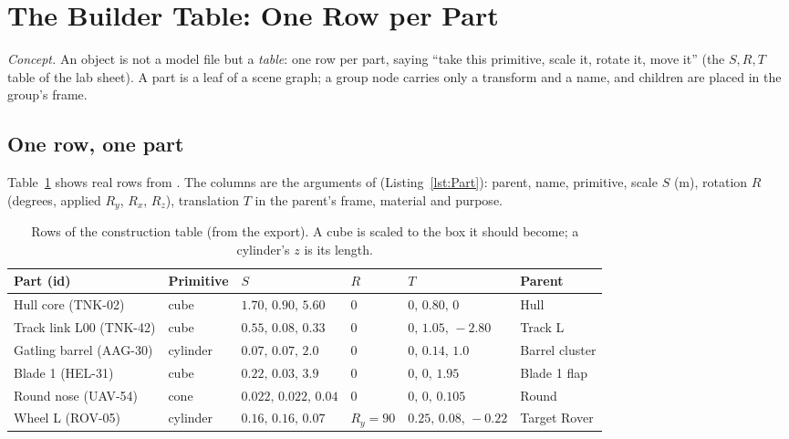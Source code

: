 \section{The Builder Table: One Row per Part}\label{sec:builder}
\emph{Concept.} An object is not a model file but a \emph{table}: one row per part, saying ``take this primitive, scale it, rotate it, move it'' (the $S,R,T$ table of the lab sheet). A part is a leaf of a scene graph; a group node carries only a transform and a name, and children are placed in the group's frame.

\subsection{One row, one part}
Table~\ref{tab:rows} shows real rows from . The columns are the arguments of
 (Listing~\ref{lst:Part}): parent, name, primitive, scale $S$ (m), rotation $R$ (degrees, applied $R_y$, $R_x$, $R_z$), translation $T$ in the parent's frame, material and purpose.
\begin{table}[h]
\centering\footnotesize
\caption{Rows of the construction table (from the export). A cube is scaled to the box it should become; a cylinder's $z$ is its length.}\label{tab:rows}
\begin{tabular}{@{}llp{2.6cm}p{2.2cm}p{2.8cm}l@{}}
\toprule Part (id) & Primitive & $S$ & $R$ & $T$ & Parent\\\midrule
Hull core (TNK-02) & cube & $1.70,\,0.90,\,5.60$ & $0$ & $0,\,0.80,\,0$ & Hull\\
Track link L00 (TNK-42) & cube & $0.55,\,0.08,\,0.33$ & $0$ & $0,\,1.05,\,-2.80$ & Track L\\
Gatling barrel (AAG-30) & cylinder & $0.07,\,0.07,\,2.0$ & $0$ & $0,\,0.14,\,1.0$ & Barrel cluster\\
Blade 1 (HEL-31) & cube & $0.22,\,0.03,\,3.9$ & $0$ & $0,\,0,\,1.95$ & Blade 1 flap\\
Round nose (UAV-54) & cone & $0.022,\,0.022,\,0.04$ & $0$ & $0,\,0,\,0.105$ & Round\\
Wheel L (ROV-05) & cylinder & $0.16,\,0.16,\,0.07$ & $R_y=90$ & $0.25,\,0.08,\,-0.22$ & Target Rover\\\bottomrule
\end{tabular}
\end{table}

\lstPart

